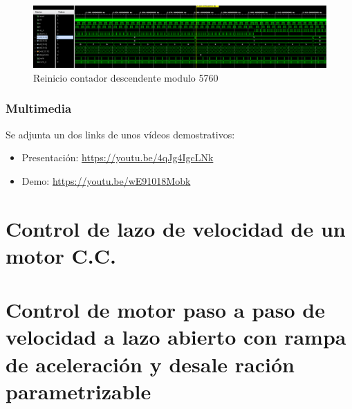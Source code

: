 \documentclass[11pt, a4paper]{article}
\begin{document}
		\begin{figure}[H]
			\centering
			\includegraphics[width=\textwidth]{Imagenes/sim_down.png}
			\caption{Reinicio contador descendente modulo 5760}
			\label{fig:cont_down}
		\end{figure} 

		\subsubsection{Multimedia}
		Se adjunta un dos links de unos vídeos demostrativos: 
		\begin{itemize}
			\item Presentación: \url{https://youtu.be/4qJg4IgcLNk}
			\item Demo: \url{https://youtu.be/wE91018Mobk}
		\end{itemize}
	\section{Control de lazo de velocidad de un motor C.C.}
	\section{Control de motor paso a paso de velocidad a lazo abierto con rampa de aceleración y desale ración parametrizable}
\end{document}
